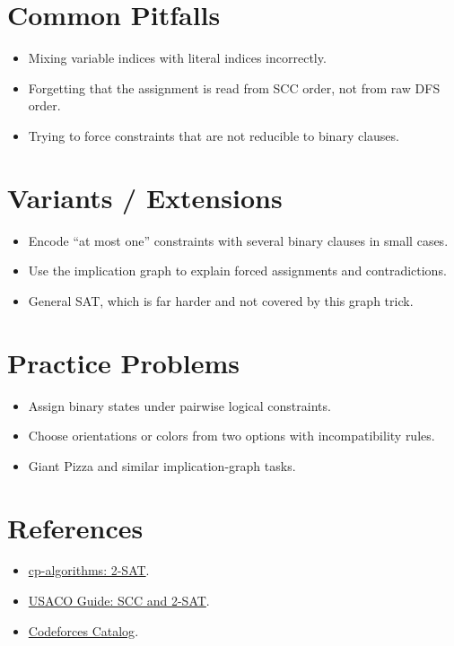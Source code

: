 \section*{Common Pitfalls}

\begin{itemize}
  \item Mixing variable indices with literal indices incorrectly.
  \item Forgetting that the assignment is read from SCC order, not from raw DFS order.
  \item Trying to force constraints that are not reducible to binary clauses.
\end{itemize}

\section*{Variants / Extensions}

\begin{itemize}
  \item Encode ``at most one'' constraints with several binary clauses in small cases.
  \item Use the implication graph to explain forced assignments and contradictions.
  \item General SAT, which is far harder and not covered by this graph trick.
\end{itemize}

\section*{Practice Problems}

\begin{itemize}
  \item Assign binary states under pairwise logical constraints.
  \item Choose orientations or colors from two options with incompatibility rules.
  \item Giant Pizza and similar implication-graph tasks.
\end{itemize}

\section*{References}

\begin{itemize}
  \item \href{https://cp-algorithms.com/graph/2SAT.html}{cp-algorithms: 2-SAT}.
  \item \href{https://usaco.guide/adv/SCC}{USACO Guide: SCC and 2-SAT}.
  \item \href{https://codeforces.com/catalog?locale=en}{Codeforces Catalog}.
\end{itemize}
